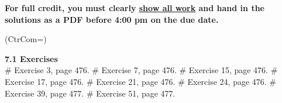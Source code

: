 \documentclass[11pt]{book}
\begin{document}
\thispagestyle{fancy}
\noindent	\textbf{For full credit, you must clearly \underline{show all work} and hand in the solutions as a PDF before 4:00 pm on the due date.}\hfill
\vspace{0.3in}
\begin{easylist}
\ListProperties(CtrCom=\fbox)


\noindent\textbf{7.1 Exercises}\\
\vspace{0.25in}
# Exercise 3, page 476.
\vspace{0.2in}
# Exercise 7, page 476.
\vspace{0.2in}
# Exercise 15, page 476.
\vspace{0.2in}
# Exercise 17, page 476.
\vspace{0.2in}  
# Exercise 21, page 476.
\vspace{0.2in}
# Exercise 24, page 476.
\vspace{0.2in}
# Exercise 39, page 477.
\vspace{0.2in}
# Exercise 51, page 477.
 \end{easylist}
\end{document}
